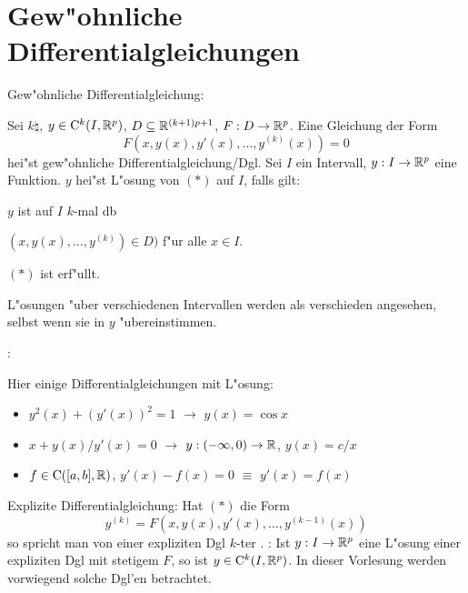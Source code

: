 \section{Gew"ohnliche Differentialgleichungen}
 Gew"ohnliche Differentialgleichung:{
  Sei $k\natural$, $y\in{\rm C}^k(I,\mathbb R^p)$, $D\subseteq\mathbb R^{(k+1)p+1}$, 
  $F:D\to\mathbb R^p$.
  Eine Gleichung der Form
  \begin{equation*}
    F(x,y(x),y'(x),\ldots,y^{(k)}(x))=0 \tag{*}
    \end{equation*}
  hei"st gew"ohnliche Differentialgleichung/Dgl. Sei $I$ ein Intervall, 
  $y:I\to\mathbb R^p$ eine Funktion. $y$ hei"st L"osung von $(*)$ auf $I$,
  falls gilt:
  \begin{stmts}
    \item $y$ ist auf $I$ $k$-mal db
    \item $(x,y(x),\ldots,y^{(k)})\in D)$ f"ur alle $x\in I$.
    \item $(*)$ ist erf"ullt.
    \end{stmts}
  L"osungen "uber verschiedenen Intervallen werden als verschieden angesehen,
  selbst wenn sie in $y$ "ubereinstimmen.
  }
\example:{
  Hier einige Differentialgleichungen mit L"osung:
  \begin{itemize}
    \item $y^2(x)+(y'(x))^2=1$ $\to$ $y(x)=\cos x$
    \item $x+y(x)/y'(x)=0$ $\to$ $y:(-\infty,0)\to\mathbb R$, $y(x)=c/x$
    \item $f\in{\rm C}([a,b],\mathbb R)$, $y'(x)-f(x)=0$ $\equiv$ $y'(x)=f(x)$
    \end{itemize}
  }
 Explizite Differentialgleichung:{
  Hat $(*)$ die Form
  \[y^{(k)}=F(x,y(x),y'(x),\ldots,y^{(k-1)}(x))
    \]
  so spricht man von einer expliziten Dgl $k$-ter .
  }
\remark:{
  Ist $y:I\to\mathbb R^p$ eine L"osung einer expliziten Dgl mit stetigem $F$, so 
  ist $y\in{\rm C}^k(I,\mathbb R^p)$. 
  In dieser Vorlesung werden vorwiegend solche Dgl'en betrachtet. 
  }
